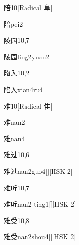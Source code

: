 \begin{entry}{陪}{10}[Radical 阜]
  \begin{phonetics}{陪}{pei2}
  \end{phonetics}
\end{entry}

\begin{entry}{陵园}{10,7}
  \begin{phonetics}{陵园}{ling2yuan2}
  \end{phonetics}
\end{entry}

\begin{entry}{陷入}{10,2}
  \begin{phonetics}{陷入}{xian4ru4}
  \end{phonetics}
\end{entry}

\begin{entry}{难}{10}[Radical 隹]
  \begin{phonetics}{难}{nan2}
  \end{phonetics}
  \begin{phonetics}{难}{nan4}
  \end{phonetics}
\end{entry}

\begin{entry}{难过}{10,6}
  \begin{phonetics}{难过}{nan2guo4}[][HSK 2]
  \end{phonetics}
\end{entry}

\begin{entry}{难听}{10,7}
  \begin{phonetics}{难听}{nan2 ting1}[][HSK 2]
  \end{phonetics}
\end{entry}

\begin{entry}{难受}{10,8}
  \begin{phonetics}{难受}{nan2shou4}[][HSK 2]
  \end{phonetics}
\end{entry}

